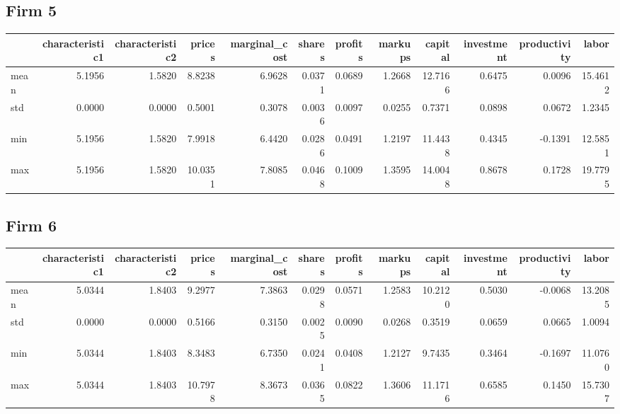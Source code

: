 \subsection*{Firm 5}
\begin{tabular}{lrrrrrrrrrrr}
\toprule
{} &  characteristic1 &  characteristic2 &  prices &  marginal\_cost &  shares &  profits &  markups &  capital &  investment &  productivity &   labor \\
\midrule
mean &           5.1956 &           1.5820 &  8.8238 &         6.9628 &  0.0371 &   0.0689 &   1.2668 &  12.7166 &      0.6475 &        0.0096 & 15.4612 \\
std  &           0.0000 &           0.0000 &  0.5001 &         0.3078 &  0.0036 &   0.0097 &   0.0255 &   0.7371 &      0.0898 &        0.0672 &  1.2345 \\
min  &           5.1956 &           1.5820 &  7.9918 &         6.4420 &  0.0286 &   0.0491 &   1.2197 &  11.4438 &      0.4345 &       -0.1391 & 12.5851 \\
max  &           5.1956 &           1.5820 & 10.0351 &         7.8085 &  0.0468 &   0.1009 &   1.3595 &  14.0048 &      0.8678 &        0.1728 & 19.7795 \\
\bottomrule
\end{tabular}


\subsection*{Firm 6}
\begin{tabular}{lrrrrrrrrrrr}
\toprule
{} &  characteristic1 &  characteristic2 &  prices &  marginal\_cost &  shares &  profits &  markups &  capital &  investment &  productivity &   labor \\
\midrule
mean &           5.0344 &           1.8403 &  9.2977 &         7.3863 &  0.0298 &   0.0571 &   1.2583 &  10.2120 &      0.5030 &       -0.0068 & 13.2085 \\
std  &           0.0000 &           0.0000 &  0.5166 &         0.3150 &  0.0025 &   0.0090 &   0.0268 &   0.3519 &      0.0659 &        0.0665 &  1.0094 \\
min  &           5.0344 &           1.8403 &  8.3483 &         6.7350 &  0.0241 &   0.0408 &   1.2127 &   9.7435 &      0.3464 &       -0.1697 & 11.0760 \\
max  &           5.0344 &           1.8403 & 10.7978 &         8.3673 &  0.0365 &   0.0822 &   1.3606 &  11.1716 &      0.6585 &        0.1450 & 15.7307 \\
\bottomrule
\end{tabular}


